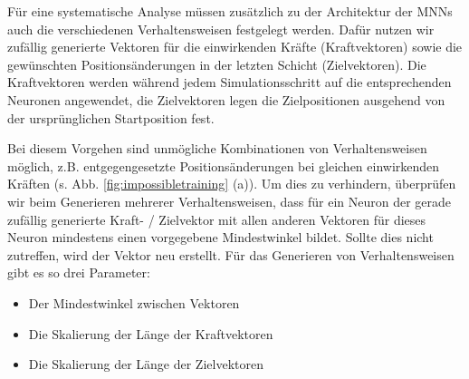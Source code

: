 Für eine systematische Analyse müssen zusätzlich zu der Architektur der MNNs auch die verschiedenen Verhaltensweisen festgelegt werden.
Dafür nutzen wir zufällig generierte Vektoren für die einwirkenden Kräfte (Kraftvektoren) sowie die gewünschten Positionsänderungen in der letzten Schicht (Zielvektoren).
Die Kraftvektoren werden während jedem Simulationsschritt auf die entsprechenden Neuronen angewendet, die Zielvektoren legen die Zielpositionen ausgehend von der ursprünglichen Startposition fest. %

Bei diesem Vorgehen sind unmögliche Kombinationen von Verhaltensweisen möglich, z.B. entgegengesetzte Positionsänderungen bei gleichen einwirkenden Kräften (s. Abb. \ref{fig:impossibletraining} (a)).
Um dies zu verhindern, überprüfen wir beim Generieren mehrerer Verhaltensweisen, dass für ein Neuron der gerade zufällig generierte Kraft- / Zielvektor mit allen anderen Vektoren für dieses Neuron mindestens einen vorgegebene Mindestwinkel bildet. 
Sollte dies nicht zutreffen, wird der Vektor neu erstellt.
Für das Generieren von Verhaltensweisen gibt es so drei Parameter:

\begin{itemize}
    \item Der Mindestwinkel zwischen Vektoren
    \item Die Skalierung der Länge der Kraftvektoren
    \item Die Skalierung der Länge der Zielvektoren
\end{itemize}

